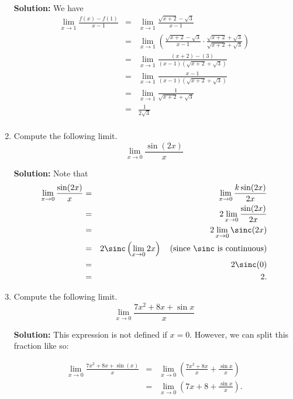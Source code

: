 \documentclass{article}
\begin{document}
\begin{enumerate}
\textbf{Solution:} We have
\begin{eqnarray*}
\lim_{x \rightarrow 1} \frac{f(x) - f(1)}{x - 1} & = & \lim_{x \rightarrow 1} \frac{\sqrt{x + 2} - \sqrt{3}}{x - 1} \\
 & = & \lim_{x \rightarrow 1} \left( \frac{\sqrt{x + 2} - \sqrt{3}}{x - 1} \cdot \frac{\sqrt{x + 2} + \sqrt{3}}{\sqrt{x + 2} + \sqrt{3}} \right) \\
 & = & \lim_{x \rightarrow 1} \frac{(x + 2) - (3)}{(x - 1)\left( \sqrt{x + 2} + \sqrt{3} \right)} \\
 & = & \lim_{x \rightarrow 1} \frac{x - 1}{(x - 1)\left( \sqrt{x + 2} + \sqrt{3} \right)} \\
 & = & \lim_{x \rightarrow 1} \frac{1}{\sqrt{x + 2} + \sqrt{3}} \\
 & = & \frac{1}{2\sqrt{3}} \\
\end{eqnarray*}


  

\item Compute the following limit. \[ \lim_{x \rightarrow 0} \frac{\sin(2 x)}{x} \]

\textbf{Solution:} Note that
\begin{eqnarray*}
\lim_{x \rightarrow 0} \frac{\sin(2 x)}{x}
 & = & \lim_{x \rightarrow 0} \frac{k\sin(2 x)}{2 x} \\
 & = & 2 \lim_{x \rightarrow 0} \frac{\sin(2 x)}{2 x} \\
 & = & 2 \lim_{x \rightarrow 0} \sinc(2 x) \\
 & = & 2 \sinc\left( \lim_{x \rightarrow 0} 2 x \right) \quad \mathrm{(since}\ \sinc\ \mathrm{is\ continuous)} \\
 & = & 2 \sinc(0) \\
 & = & 2.
\end{eqnarray*}


  

\item Compute the following limit. \[ \lim_{x \rightarrow 0} \frac{7 x^2 + 8 x + \sin x}{x} \]

\textbf{Solution:} This expression is not defined if $x = 0$. However, we can split this fraction like so:

\begin{eqnarray*}
\lim_{x \rightarrow 0} \frac{7 x^2 + 8 x + \sin(x)}{x}
 & = & \lim_{x \rightarrow 0} \left( \frac{7 x^2 + 8 x}{x} + \frac{\sin x}{x} \right) \\
 & = & \lim_{x \rightarrow 0} \left( 7 x + 8 + \frac{\sin x}{x} \right). \\
\end{eqnarray*}


\end{enumerate}
\end{document}
